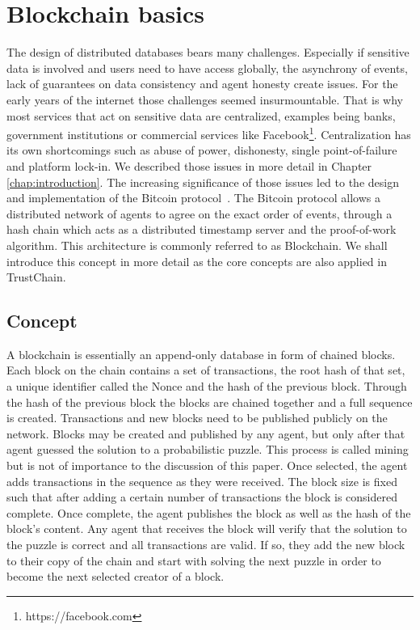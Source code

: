 \section{Blockchain basics}
The design of distributed databases bears many challenges. Especially if sensitive data is involved
and users need to have access globally, the asynchrony of events, lack of guarantees on data 
consistency and agent honesty create issues. For the early years of the internet those challenges seemed
insurmountable. That is why most services that act on sensitive data are centralized, examples being 
banks, government institutions or commercial services like Facebook\footnote{https://facebook.com}.
Centralization has its own shortcomings such as abuse of power, dishonesty, single point-of-failure
and platform lock-in. We described those issues in more detail in Chapter \ref{chap:introduction}.
The increasing significance of those issues led to the design and implementation of the Bitcoin 
protocol~\cite{nakamoto2008bitcoin}. The Bitcoin protocol allows a distributed network of agents 
to agree on the exact order of events, through a hash chain which acts as a distributed timestamp 
server and the proof-of-work algorithm. This architecture is commonly referred to as Blockchain. We
shall introduce this concept in more detail as the core concepts are also applied in TrustChain.

\subsection{Concept}
A blockchain is essentially an append-only database in form of chained blocks. Each block on the 
chain contains a set of transactions, the root hash of that set, a unique identifier called the 
Nonce and the hash of the previous block. Through the hash of the previous block the blocks are 
chained together and a full sequence is created. Transactions and new blocks need to be published publicly on 
the network. Blocks may be created and published by any agent, but only after that agent guessed 
the solution to a probabilistic puzzle. This process is called mining but is not of importance to 
the discussion of this paper. Once selected, the agent adds transactions in the sequence as they 
were received. The block size is fixed such that after adding a certain number of 
transactions the block is considered complete. Once complete, the agent publishes the
block as well as the hash of the block's content. Any agent that receives the block will verify that
the solution to the puzzle is correct and all transactions are valid. If so, they add the new block
to their copy of the chain and start with solving the next puzzle in order to become the next selected
creator of a block.

